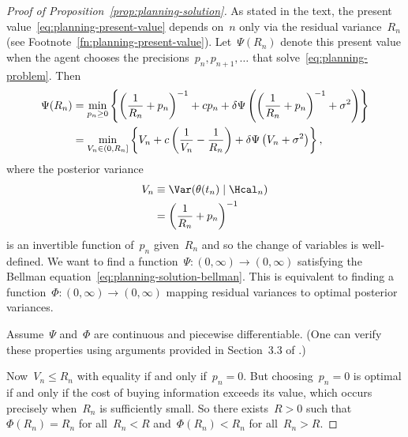 \begin{proof}[Proof of Proposition~\ref{prop:planning-solution}]
    As stated in the text, the present value~\eqref{eq:planning-present-value} depends on~$n$ only via the residual variance~$R_n$ (see Footnote~\ref{fn:planning-present-value}).
    Let~$\Psi(R_n)$ denote this present value when the agent chooses the precisions~$p_n,p_{n+1},\ldots$ that solve~\eqref{eq:planning-problem}.
    Then
    \begin{align}
        \Psi(R_n)
        &= \min_{p_n\ge0}\left\{\left(\frac{1}{R_n}+p_n\right)^{-1}+cp_n+\delta\Psi\left(\left(\frac{1}{R_n}+p_n\right)^{-1}+\sigma^2\right)\right\} \notag \\
        &= \min_{V_n\in(0,R_n]}\left\{V_n+c\left(\frac{1}{V_n}-\frac{1}{R_n}\right)+\delta\Psi\left(V_n+\sigma^2\right)\right\}, \label{eq:planning-solution-bellman}
    \end{align}
    where the posterior variance
    \begin{align*}
        V_n
        &\equiv \Var(\theta(t_n)\mid\Hcal_n) \\
        &= \left(\frac{1}{R_n}+p_n\right)^{-1}
    \end{align*}
    is an invertible function of~$p_n$ given~$R_n$ and so the change of variables is well-defined.
    We want to find a function~$\Psi:(0,\infty)\to(0,\infty)$ satisfying the Bellman equation~\eqref{eq:planning-solution-bellman}.
    This is equivalent to finding a function~$\Phi:(0,\infty)\to(0,\infty)$ mapping residual variances to optimal posterior variances.
    
    Assume~$\Psi$ and~$\Phi$ are continuous and piecewise differentiable.
    (One can verify these properties using arguments provided in Section~3.3 of \citet{Stokey-Lucas-1989-}.)

    Now~$V_n\le R_n$ with equality if and only if~$p_n=0$.
    But choosing~$p_n=0$ is optimal if and only if the cost of buying information exceeds its value, which occurs precisely when~$R_n$ is sufficiently small.
    So there exists~$R>0$ such that~$\Phi(R_n)=R_n$ for all~$R_n<R$ and~$\Phi(R_n)<R_n$ for all~$R_n>R$.


\end{proof}
